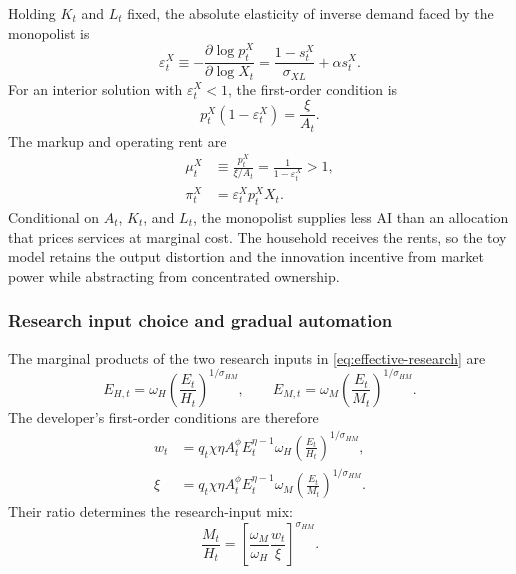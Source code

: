Holding $K_t$ and $L_t$ fixed, the absolute elasticity of inverse demand faced by
the monopolist is
\begin{equation}
    \varepsilon^X_t
    \equiv
    -\frac{\partial\log p^X_t}{\partial\log X_t}
    =
    \frac{1-s^X_t}{\sigma_{XL}}+\alpha s^X_t.
    \label{eq:inverse-demand-elasticity}
\end{equation}
For an interior solution with $\varepsilon^X_t<1$, the first-order condition is
\begin{equation}
    p^X_t(1-\varepsilon^X_t)=\frac{\xi}{A_t}.
    \label{eq:monopoly-ai-price}
\end{equation}
The markup and operating rent are
\begin{align}
    \mu^X_t
    &\equiv
    \frac{p^X_t}{\xi/A_t}
    =
    \frac{1}{1-\varepsilon^X_t}>1,
    \label{eq:monopoly-markup}\\
    \pi^X_t
    &=
    \varepsilon^X_t p^X_tX_t.
    \label{eq:monopoly-rents}
\end{align}
Conditional on $A_t$, $K_t$, and $L_t$, the monopolist supplies less AI than an
allocation that prices services at marginal cost. The household receives the rents,
so the toy model retains the output distortion and the innovation incentive from
market power while abstracting from concentrated ownership.

\subsubsection{Research input choice and gradual automation}

The marginal products of the two research inputs in
\eqref{eq:effective-research} are
\begin{equation}
    E_{H,t}
    =\omega_H\left(\frac{E_t}{H_t}\right)^{1/\sigma_{HM}},
    \qquad
    E_{M,t}
    =\omega_M\left(\frac{E_t}{M_t}\right)^{1/\sigma_{HM}}.
    \label{eq:research-ces-marginal-products}
\end{equation}
The developer's first-order conditions are therefore
\begin{align}
    w_t
    &=
    q_t\chi\eta A_t^\phi E_t^{\eta-1}
    \omega_H\left(\frac{E_t}{H_t}\right)^{1/\sigma_{HM}},
    \label{eq:foc-human}\\
    \xi
    &=
    q_t\chi\eta A_t^\phi E_t^{\eta-1}
    \omega_M\left(\frac{E_t}{M_t}\right)^{1/\sigma_{HM}}.
    \label{eq:private-compute-foc}
\end{align}
Their ratio determines the research-input mix:
\begin{equation}
    \frac{M_t}{H_t}
    =
    \left[
        \frac{\omega_M}{\omega_H}\frac{w_t}{\xi}
    \right]^{\sigma_{HM}}.
    \label{eq:research-input-ratio}
\end{equation}

